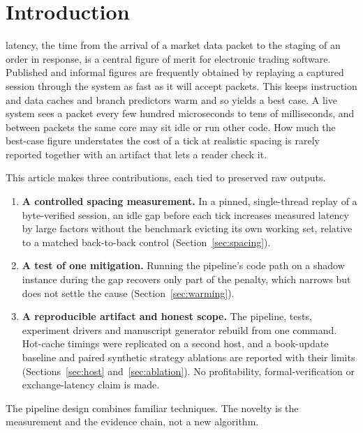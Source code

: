 \documentclass{ieeeaccess}
\begin{document}
\titlepgskip=-21pt

\maketitle

\section{Introduction}
\label{sec:introduction}
 latency, the time from the arrival of a market data packet to the staging of an order in response, is a central figure of merit for electronic trading software. Published and informal figures are frequently obtained by replaying a captured session through the system as fast as it will accept packets. This keeps instruction and data caches and branch predictors warm and so yields a best case. A live system sees a packet every few hundred microseconds to tens of milliseconds, and between packets the same core may sit idle or run other code. How much the best-case figure understates the cost of a tick at realistic spacing is rarely reported together with an artifact that lets a reader check it.

This article makes three contributions, each tied to preserved raw outputs.
\begin{enumerate}
\item \textbf{A controlled spacing measurement.} In a pinned, single-thread replay of a byte-verified session, an idle gap before each tick increases measured latency by large factors without the benchmark evicting its own working set, relative to a matched back-to-back control (Section~\ref{sec:spacing}).
\item \textbf{A test of one mitigation.} Running the pipeline's code path on a shadow instance during the gap recovers only part of the penalty, which narrows but does not settle the cause (Section~\ref{sec:warming}).
\item \textbf{A reproducible artifact and honest scope.} The pipeline, tests, experiment drivers and manuscript generator rebuild from one command. Hot-cache timings were replicated on a second host, and a book-update baseline and paired synthetic strategy ablations are reported with their limits (Sections~\ref{sec:host} and~\ref{sec:ablation}). No profitability, formal-verification or exchange-latency claim is made.
\end{enumerate}
The pipeline design combines familiar techniques. The novelty is the measurement and the evidence chain, not a new algorithm.
\end{document}

